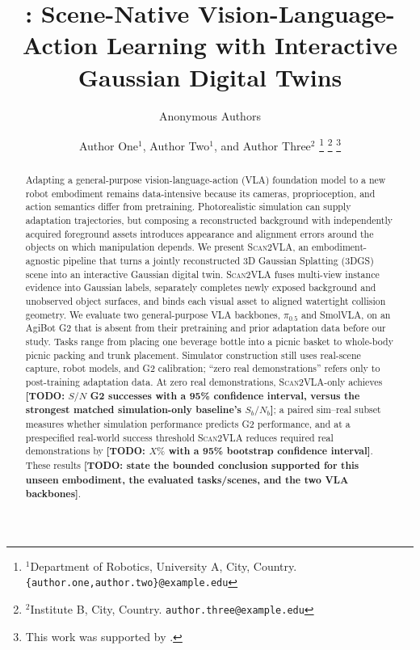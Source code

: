 \documentclass[letterpaper,10pt,conference]{ieeeconf}
\title{\system: Scene-Native Vision-Language-Action Learning with
Interactive Gaussian Digital Twins}
\author{Anonymous Authors}
\author{Author One$^{1}$, Author Two$^{1}$, and Author Three$^{2}$%
    \thanks{$^{1}$Department of Robotics, University A, City, Country.
      {\tt\small \{author.one,author.two\}@example.edu}}%
    \thanks{$^{2}$Institute B, City, Country.
      {\tt\small author.three@example.edu}}%
    \thanks{This work was supported by \todo{funding source}.}%
  }
\newcommand{\system}{\textsc{Scan2VLA}}
\newcommand{\todo}[1]{\textbf{[TODO: #1]}}
\newcommand{\piHalf}{\ensuremath{\pi_{0.5}}}
\begin{document}
\maketitle
\thispagestyle{empty}
\pagestyle{empty}

\begin{abstract}
Adapting a general-purpose vision-language-action (VLA) foundation model to a
new robot embodiment remains data-intensive because its cameras, proprioception,
and action semantics differ from pretraining. Photorealistic simulation can
supply adaptation trajectories, but composing a reconstructed background with
independently acquired foreground assets introduces appearance and alignment
errors around the objects on which manipulation depends. We present \system{}, an
embodiment-agnostic pipeline that turns a jointly reconstructed 3D Gaussian
Splatting (3DGS) scene into an interactive Gaussian digital twin. \system{} fuses
multi-view instance evidence into Gaussian labels, separately completes newly
exposed background and unobserved object surfaces, and binds each visual asset to
aligned watertight collision geometry. We evaluate two general-purpose VLA
backbones, \piHalf{} and SmolVLA, on an AgiBot G2 that is absent from their
pretraining and prior adaptation data before our study.
Tasks range from placing one beverage bottle into a picnic basket to whole-body
picnic packing and trunk placement. Simulator construction still uses real-scene
capture, robot models, and G2 calibration; ``zero real demonstrations'' refers
only to post-training adaptation data. At zero real demonstrations, \system-only
achieves \todo{$S/N$ G2 successes with a 95\% confidence interval, versus the
strongest matched simulation-only baseline's $S_b/N_b$}; a paired sim--real
subset measures whether simulation performance predicts G2 performance, and at a
prespecified real-world success threshold \system{} reduces required real
demonstrations by \todo{$X\%$ with a 95\% bootstrap confidence interval}.
These results \todo{state the bounded conclusion supported for this unseen
embodiment, the evaluated tasks/scenes, and the two VLA backbones}.
\end{abstract}

\end{document}
